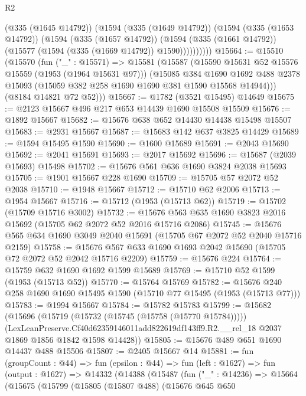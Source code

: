 \begin{lexlean}{R2}
\begin{coremodule}
            (@335 (@1645 @14792))
            (@1594
              (@335 (@1649 @14792))
              (@1594
                (@335 (@1653 @14792))
                (@1594
                  (@335 (@1657 @14792))
                  (@1594 (@335 (@1661 @14792)) (@15577 (@1594 (@335 (@1669 @14792)) @1590))))))))))
@15664 := @15510
    (@15570
      (fun ("_" : @15571) =>
      @15581
        (@15587
          (@15590 @15631 @52 @15576 @15559 (@1953 (@1964 @15631 @97)))
          (@15085
            @384
            @1690
            @1692
            @488
            @2378
            @15093
            (@15059 @382 @258 @1690 @1690 @381 @1590 @15568 @14944)))
        (@8184 @14821 @72 @52)))
@15667 := @1782 (@3521 @15495) @14649
@15675 := @2123 @15667 @496 @217 @653 @14439 @1690 @15508 @15509
@15676 := @1892 @15667
@15682 := @15676 @638 @652 @14430 @14438 @15498 @15507
@15683 := @2931 @15667
@15687 := @15683 @142 @637 @3825 @14429
@15689 := @1594 @15495 @1590
@15690 := @1600 @15689
@15691 := @2043 @15690
@15692 := @2041 @15691
@15693 := @2017 @15692
@15696 := @15687 (@2039 @15693) @15498
@15702 := @15676 @561 @636 @1690 @3824 @2038 @15693
@15705 := @1901 @15667 @228 @1690
@15709 := @15705 @57 @2072 @52 @2038
@15710 := @1948 @15667
@15712 := @15710 @62 @2006
@15713 := @1954 @15667
@15716 := @15712 (@1953 (@15713 @62))
@15719 := @15702 (@15709 @15716 @3002)
@15732 := @15676 @563 @635 @1690 @3823 @2016 @15692 (@15705 @62 @2072 @52 @2016 @15716 @2086)
@15745 := @15676 @565 @634 @1690 @3049 @2040 @15691 (@15705 @67 @2072 @52 @2040 @15716 @2159)
@15758 := @15676 @567 @633 @1690 @1693 @2042 @15690 (@15705 @72 @2072 @52 @2042 @15716 @2209)
@15759 := @15676 @224
@15764 := @15759 @632 @1690 @1692 @1599 @15689
@15769 := @15710 @52 @1599 (@1953 (@15713 @52))
@15770 := @15764 @15769
@15782 := @15676 @240 @258 @1690 @1690 @15495 @1590 (@15710 @77 @15495 (@1953 (@15713 @77)))
@15783 := @1994 @15667
@15784 := @15782 @15783
@15799 := @15682
    (@15696
      (@15719 (@15732 (@15745 (@15758 (@15770 @15784)))))
      (LexLeanPreserve.Cf40d62359146011add822619df143ff9.R2.__rel_18
        @2037
        @1869
        @1856
        @1842
        @1598
        @14428))
@15805 := @15676 @489 @651 @1690 @14437 @488 @15506
@15807 := @2405 @15667 @14
@15881 := fun (groupCount : @44) =>
  fun (epsilon : @44) =>
  fun (left : @1627) =>
  fun (output : @1627) =>
  @14332
    (@14388
      (@15487
        (fun ("_" : @14236) =>
        @15664
          (@15675
            (@15799
              (@15805
                (@15807 @488)
                (@15676
                  @645
                  @650

\end{coremodule}
\end{lexlean}

